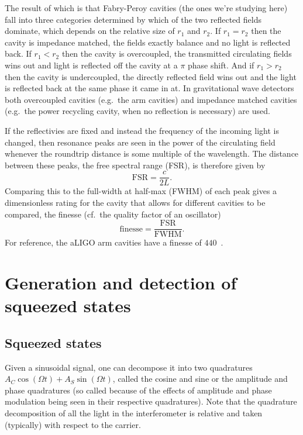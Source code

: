 \documentclass[aps,pra,superscriptaddress,reprint,nofootinbib]{revtex4-1}
\begin{document}
The result of which is that Fabry-Peroy cavities (the ones we’re studying here) fall into three categories determined by which of the two reflected fields dominate, which depends on the relative size of $r_1$ and $r_2$. If $r_1 = r_2$ then the cavity is impedance matched, the fields exactly balance and no light is reflected back. If $r_1 < r_2$ then the cavity is overcoupled, the transmitted circulating fields wins out and light is reflected off the cavity at a $\pi$ phase shift. And if $r_1 > r_2$ then the cavity is undercoupled, the directly reflected field wins out and the light is reflected back at the same phase it came in at. In gravitational wave detectors both overcoupled cavities (e.g.\ the arm cavities) and impedance matched cavities (e.g.\ the power recycling cavity, when no reflection is necessary) are used.


If the reflectivies are fixed and instead the frequency of the incoming light is changed, then resonance peaks are seen in the power of the circulating field whenever the roundtrip distance is some multiple of the wavelength. The distance between these peaks, the free spectral range (FSR), is therefore given by $$\mathrm{FSR} = \frac{c}{2L}.$$ Comparing this to the full-width at half-max (FWHM) of each peak gives a dimensionless rating for the cavity that allows for different cavities to be compared, the finesse (cf.\ the quality factor of an oscillator) $$\mathrm{finesse} = \frac{\mathrm{FSR}}{\mathrm{FWHM}}.$$ For reference, the aLIGO arm cavities have a finesse of $440$~\cite{AdvancedLIGO:2015}.


\section{Generation and detection of squeezed states}
\label{sec:squeezing}

\subsection{Squeezed states}

Given a sinusoidal signal, one can decompose it into two quadratures $A_C \cos(\Omega t) + A_S \sin(\Omega t)$, called the cosine and sine or the amplitude and phase quadratures (so called because of the effects of amplitude and phase modulation being seen in their respective quadratures). Note that the quadrature decomposition of all the light in the interferometer is relative and taken (typically) with respect to the carrier.
\end{document}
